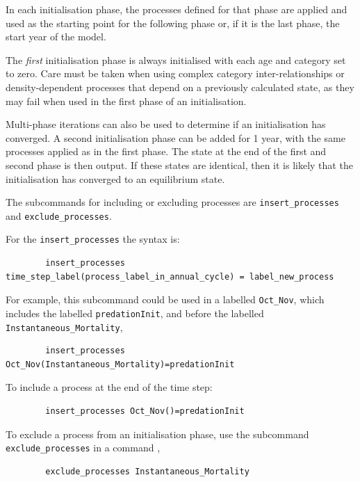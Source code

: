 In each initialisation phase, the processes defined for that phase are applied and used as the starting point for the following phase or, if it is the last phase, the start year of the model.

The \emph{first} initialisation phase is always initialised with each age and category set to zero. Care must be taken when using complex category inter-relationships or density-dependent processes that depend on a previously calculated state, as they may fail when used in the first phase of an initialisation.

Multi-phase iterations can also be used to determine if an initialisation has converged. A second initialisation phase can be added for 1 year, with the same processes applied as in the first phase. The state at the end of the first and second phase is then output. If these states are identical, then it is likely that the initialisation has converged to an equilibrium state.

The subcommands for including or excluding processes are \texttt{insert\_processes} and \texttt{exclude\_processes}.

For the \texttt{insert\_processes} the syntax is:

{\small{\begin{verbatim}
		insert_processes time_step_label(process_label_in_annual_cycle) = label_new_process
\end{verbatim}}}

For example, this subcommand could be used in a  labelled \texttt{Oct\_Nov}, which includes the  labelled \texttt{predationInit}, and before the  labelled \texttt{Instantaneous\_Mortality},

{\small{\begin{verbatim}
		insert_processes Oct_Nov(Instantaneous_Mortality)=predationInit
\end{verbatim}}}

To include a process at the end of the time step:

{\small{\begin{verbatim}
		insert_processes Oct_Nov()=predationInit
		\end{verbatim}}}

To exclude a process from an initialisation phase, use the subcommand \texttt{exclude\_processes} in a command ,

{\small{\begin{verbatim}
		exclude_processes Instantaneous_Mortality
		\end{verbatim}}}

